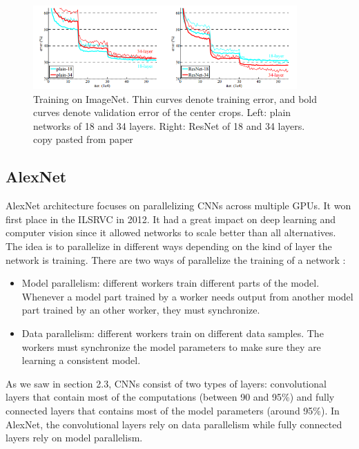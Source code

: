 \begin{figure}[!htp]
    \centering
        \includegraphics[width=0.9\textwidth]{./figures/02-Resnet_comparing_acc}
        \caption{Training on ImageNet. Thin curves denote training error, and bold curves denote validation error of the center crops. Left: plain
networks of 18 and 34 layers. Right: ResNet of 18 and 34 layers. copy pasted from paper}\label{fig:resnetaccs}
\end{figure}

\subsection{AlexNet}
AlexNet architecture focuses on parallelizing CNNs across multiple GPUs. It won first place in the ILSRVC in 2012. It had a great impact on deep learning and computer vision since it allowed networks to scale better than all alternatives.
The idea is to parallelize in different ways depending on the kind of layer the network is training. There are two ways of parallelize the training of a network : 
\begin{itemize}
    \item Model parallelism: different workers train different parts of the model. Whenever a model part trained by a worker needs output from another model part trained by an other worker, they must synchronize.  
    \item Data parallelism: different workers train on different data samples. The workers must synchronize the model parameters to make sure they are learning a consistent model. 
\end{itemize}
As we saw in section 2.3, CNNs consist of two types of layers: convolutional layers that contain most of the computations (between 90 and 95\%) and fully connected layers that contains most of the model parameters (around 95\%). In AlexNet, the convolutional layers rely on data parallelism while fully connected layers rely on model parallelism. 

